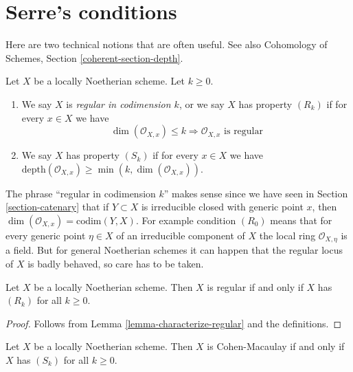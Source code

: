 \section{Serre's conditions}
\label{section-Rk}

\noindent
Here are two technical notions that are often useful.
See also Cohomology of Schemes, Section \ref{coherent-section-depth}.

\begin{definition}
\label{definition-Rk}
Let $X$ be a locally Noetherian scheme. Let $k \geq 0$.
\begin{enumerate}
\item We say $X$ is {\it regular in codimension $k$},
or we say $X$ has property {\it $(R_k)$} if for every $x \in X$
we have
$$
\dim(\mathcal{O}_{X, x}) \leq k
\Rightarrow
\mathcal{O}_{X, x}\text{ is regular}
$$
\item We say $X$ has property {\it $(S_k)$} if for every $x \in X$ we have
$\text{depth}(\mathcal{O}_{X, x}) \geq \min(k, \dim(\mathcal{O}_{X, x}))$.
\end{enumerate}
\end{definition}

\noindent
The phrase ``regular in codimension $k$'' makes sense since we have seen
in Section \ref{section-catenary} that if $Y \subset X$ is irreducible
closed with generic point $x$, then
$\dim(\mathcal{O}_{X, x}) = \text{codim}(Y, X)$. For example condition
$(R_0)$ means that for every generic point $\eta \in X$ of an irreducible
component of $X$ the local ring $\mathcal{O}_{X, \eta}$ is a field.
But for general Noetherian schemes it can happen that the regular locus
of $X$ is badly behaved, so care has to be taken.

\begin{lemma}
\label{lemma-scheme-regular-iff-all-Rk}
Let $X$ be a locally Noetherian scheme.
Then $X$ is regular if and only if $X$ has $(R_k)$ for all $k \geq 0$.
\end{lemma}

\begin{proof}
Follows from Lemma \ref{lemma-characterize-regular} and the definitions.
\end{proof}

\begin{lemma}
\label{lemma-scheme-CM-iff-all-Sk}
Let $X$ be a locally Noetherian scheme.
Then $X$ is Cohen-Macaulay if and only if $X$ has $(S_k)$ for all $k \geq 0$.
\end{lemma}

